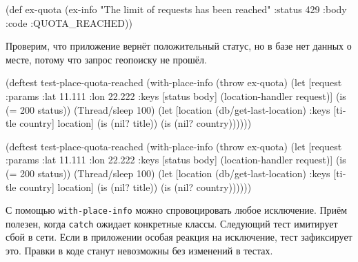 \else

\begin{english}
  \begin{clojure}
(def ex-quota
  (ex-info "The limit of requests has been reached"
           {:status 429 :body {:code :QUOTA_REACHED}}))
  \end{clojure}
\end{english}

\fi

\noindent
Проверим, что приложение вернёт положительный статус, но в базе нет данных о
месте, потому что запрос геопоиску не прошёл.

\ifx\DEVICETYPE\MOBILE

\begin{english}
  \begin{clojure}
(deftest test-place-quota-reached
  (with-place-info (throw ex-quota)
  (let [request {:params {:lat 11.111
                          :lon 22.222}}
        {:keys [status body]}
        (location-handler request)]
      (is (= 200 status))
      (Thread/sleep 100)
      (let [location
            (db/get-last-location)
            {:keys [title country]}
            location]
        (is (nil? title))
        (is (nil? country))))))
  \end{clojure}
\end{english}

\else

\begin{english}
  \begin{clojure}
(deftest test-place-quota-reached
  (with-place-info (throw ex-quota)
    (let [request {:params {:lat 11.111 :lon 22.222}}
          {:keys [status body]} (location-handler request)]
      (is (= 200 status))
      (Thread/sleep 100)
      (let [location (db/get-last-location)
            {:keys [title country]} location]
        (is (nil? title))
        (is (nil? country))))))
  \end{clojure}
\end{english}

\fi

С помощью \verb|with-place-info| можно спровоцировать любое исключение. Приём
полезен, когда \verb|catch| ожидает конкретные классы. Следующий тест имитирует
сбой в сети. Если в приложении особая реакция на исключение, тест зафиксирует
это. Правки в коде станут невозможны без изменений в тестах.


\ifx\DEVICETYPE\MOBILE


